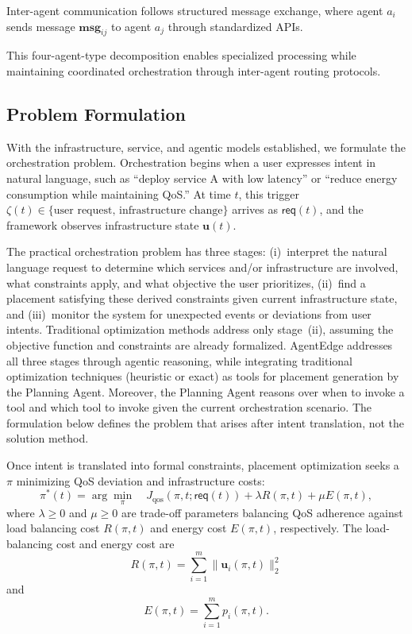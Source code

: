 Inter-agent communication follows structured message exchange, where agent $a_i$ sends message $\mathbf{msg}_{ij}$ to agent $a_j$ through standardized \acp{API}. 

This four-agent-type decomposition enables specialized processing while maintaining coordinated orchestration through inter-agent routing protocols.

\subsection{Problem Formulation}
\label{subsec:ch5_problem_formulation}

With the infrastructure, service, and agentic models established, we formulate the orchestration problem. Orchestration begins when a user expresses intent in natural language, such as ``deploy service A with low latency'' or ``reduce energy consumption while maintaining \ac{QoS}.'' At time $t$, this trigger $\zeta(t) \in \{\text{user request},\, \text{infrastructure change}\}$ arrives as $\mathsf{req}(t)$, and the framework observes infrastructure state $\mathbf{u}(t)$.

The practical orchestration problem has three stages: (i)~interpret the natural language request to determine which services and/or infrastructure are involved, what constraints apply, and what objective the user prioritizes, (ii)~find a placement satisfying these derived constraints given current infrastructure state, and (iii)~monitor the system for unexpected events or deviations from user intents. Traditional optimization methods address only stage~(ii), assuming the objective function and constraints are already formalized. \ac{AgentEdge} addresses all three stages through agentic reasoning, while integrating traditional optimization techniques (heuristic or exact) as tools for placement generation by the Planning Agent. Moreover, the Planning Agent reasons over when to invoke a tool and which tool to invoke given the current orchestration scenario. The formulation below defines the problem that arises after intent translation, not the solution method.

Once intent is translated into formal constraints, placement optimization seeks a $\pi$ minimizing \ac{QoS} deviation and infrastructure costs:
\begin{equation}
\pi^*(t) = \arg\min_\pi \quad J_{\mathrm{qos}}(\pi, t; \mathsf{req}(t)) + \lambda R(\pi, t) + \mu E(\pi, t),
\label{eq:ch5_objective}
\end{equation}
where $\lambda \geq 0$ and $\mu \geq 0$ are trade-off parameters balancing \ac{QoS} adherence against load balancing cost $R(\pi, t)$ and energy cost $E(\pi, t)$, respectively. The load-balancing cost and energy cost are
\begin{equation}
R(\pi, t) = \sum_{i=1}^m \|\mathbf{u}_i(\pi, t)\|_2^2
\label{eq:ch5_balance}
\end{equation}
and
\begin{equation}
E(\pi, t) = \sum_{i=1}^m p_i(\pi, t).
\label{eq:ch5_energy}
\end{equation}

